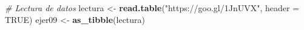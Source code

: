 \documentclass[
]{book}
\newenvironment{Shaded}{\begin{snugshade}}{\end{snugshade}}
\newcommand{\CommentTok}[1]{\textcolor[rgb]{0.56,0.35,0.01}{\textit{#1}}}
\newcommand{\DataTypeTok}[1]{\textcolor[rgb]{0.13,0.29,0.53}{#1}}
\newcommand{\KeywordTok}[1]{\textcolor[rgb]{0.13,0.29,0.53}{\textbf{#1}}}
\newcommand{\NormalTok}[1]{#1}
\newcommand{\OtherTok}[1]{\textcolor[rgb]{0.56,0.35,0.01}{#1}}
\newcommand{\StringTok}[1]{\textcolor[rgb]{0.31,0.60,0.02}{#1}}
\theoremstyle{definition}
\theoremstyle{definition}
\theoremstyle{definition}
\theoremstyle{remark}
\begin{document}
\begin{Shaded}
\begin{Highlighting}[]
\CommentTok{# Lectura de datos}
\NormalTok{lectura <-}\StringTok{ }\KeywordTok{read.table}\NormalTok{(}\StringTok{"https://goo.gl/1JnUVX"}\NormalTok{, }\DataTypeTok{header =} \OtherTok{TRUE}\NormalTok{) }
\NormalTok{ejer09 <-}\StringTok{ }\KeywordTok{as_tibble}\NormalTok{(lectura)}
\end{Highlighting}
\end{Shaded}

\backmatter
  
\end{document}
